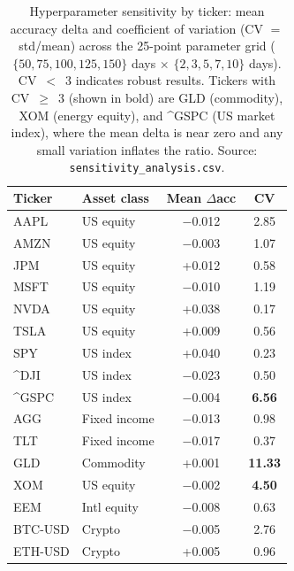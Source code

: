 \begin{appendices}
\begin{table}[htbp]
  \centering
  \caption{Hyperparameter sensitivity by ticker: mean accuracy delta and coefficient
    of variation (CV $=$ std/mean) across the 25-point parameter grid
    ($\{50,75,100,125,150\}$ days $\times$ $\{2,3,5,7,10\}$ days).
    CV~$<$~3 indicates robust results.  Tickers with CV~$\geq$~3 (shown in bold)
    are GLD (commodity), XOM (energy equity), and \^{}GSPC (US market index),
    where the mean delta is near zero and any small variation inflates the ratio.
    Source: \texttt{sensitivity\_analysis.csv}.}
  \label{tab:sensitivity}
  \small
  \begin{tabular}{llcc}
    \hline
    \textbf{Ticker} & \textbf{Asset class} & \textbf{Mean $\Delta$acc} & \textbf{CV} \\
    \hline
    AAPL    & US equity      & $-$0.012 & 2.85 \\
    AMZN    & US equity      & $-$0.003 & 1.07 \\
    JPM     & US equity      & +0.012   & 0.58 \\
    MSFT    & US equity      & $-$0.010 & 1.19 \\
    NVDA    & US equity      & +0.038   & 0.17 \\
    TSLA    & US equity      & +0.009   & 0.56 \\
    SPY     & US index       & +0.040   & 0.23 \\
    \^{}DJI & US index       & $-$0.023 & 0.50 \\
    \^{}GSPC& US index       & $-$0.004 & \textbf{6.56} \\
    AGG     & Fixed income   & $-$0.013 & 0.98 \\
    TLT     & Fixed income   & $-$0.017 & 0.37 \\
    GLD     & Commodity      & +0.001   & \textbf{11.33} \\
    XOM     & US equity      & $-$0.002 & \textbf{4.50} \\
    EEM     & Intl equity    & $-$0.008 & 0.63 \\
    BTC-USD & Crypto         & $-$0.005 & 2.76 \\
    ETH-USD & Crypto         & +0.005   & 0.96 \\
    \hline
  \end{tabular}
\end{table}


\end{appendices}
